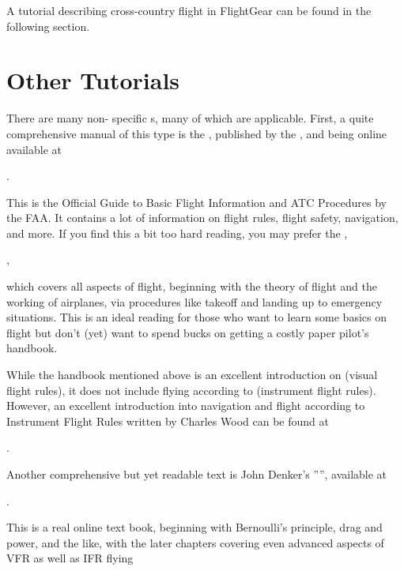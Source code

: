 A tutorial describing cross-country flight in FlightGear can be found in the following section.

\section{Other Tutorials}

There are many non-\FlightGear{} specific s, many of which are applicable. First, a quite
comprehensive manual of this type is the , published by the , and being online
available at

\medskip
{}.
\medskip
\noindent

This is the Official Guide to Basic Flight Information and ATC Procedures by the FAA. It
contains a lot of information on flight rules, flight safety, navigation, and more. If
you find this a bit too hard reading, you may prefer the ,

\medskip
{},
\medskip
\noindent

which covers all aspects of flight, beginning with the theory of flight and the working
of airplanes, via procedures like takeoff and landing up to emergency situations. This is
an ideal reading for those who want to learn some basics on flight but don't (yet) want
to spend bucks on getting a costly paper pilot's handbook.

While the handbook mentioned above is an excellent introduction on  (visual
flight rules), it does not include flying according to  (instrument flight
rules). However, an excellent introduction into navigation and flight according to
Instrument Flight Rules written by Charles Wood can be found at

.

Another comprehensive but yet readable text is John Denker's
'''', available at
\medskip

.
\medskip

 \noindent
This is a real online text book, beginning with Bernoulli's principle, drag and power,
and the like, with the later chapters covering even advanced aspects of VFR as well as
IFR flying


